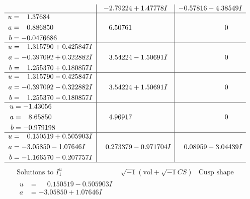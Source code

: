 \documentclass[1p]{elsarticle_modified}
\theoremstyle{definition}
\newcommand{\I}{\sqrt{-1}}
\begin{document}
$$\begin{array}{c|c|c}
 & -2.79224 + 1.47778 I & -0.57816 - 4.38549 I \\ \hline\begin{aligned}
u &= \phantom{-}1.37684\phantom{ +0.000000I} \\
a &= \phantom{-}0.886850\phantom{ +0.000000I} \\
b &= -0.0476686\phantom{ +0.000000I}\end{aligned}
 & \phantom{-}6.50761\phantom{ +0.000000I} & \phantom{-0.000000 } 0 \\ \hline\begin{aligned}
u &= \phantom{-}1.315790 + 0.425847 I \\
a &= -0.397092 + 0.322882 I \\
b &= \phantom{-}1.255370 + 0.180857 I\end{aligned}
 & \phantom{-}3.54224 - 1.50691 I & \phantom{-0.000000 } 0 \\ \hline\begin{aligned}
u &= \phantom{-}1.315790 - 0.425847 I \\
a &= -0.397092 - 0.322882 I \\
b &= \phantom{-}1.255370 - 0.180857 I\end{aligned}
 & \phantom{-}3.54224 + 1.50691 I & \phantom{-0.000000 } 0 \\ \hline\begin{aligned}
u &= -1.43056\phantom{ +0.000000I} \\
a &= \phantom{-}8.65850\phantom{ +0.000000I} \\
b &= -0.979198\phantom{ +0.000000I}\end{aligned}
 & \phantom{-}4.96917\phantom{ +0.000000I} & \phantom{-0.000000 } 0 \\ \hline\begin{aligned}
u &= \phantom{-}0.150519 + 0.505903 I \\
a &= -3.05850 - 1.07646 I \\
b &= -1.166570 - 0.207757 I\end{aligned}
 & \phantom{-}0.273379 - 0.971704 I & \phantom{-}0.08959 - 3.04439 I\\
 \hline 
 \end{array}$$\newpage$$\begin{array}{c|c|c}  
\text{Solutions to }I^u_{1}& \I (\text{vol} + \sqrt{-1}CS) & \text{Cusp shape}\\
 \hline 
\begin{aligned}
u &= \phantom{-}0.150519 - 0.505903 I \\
a &= -3.05850 + 1.07646 I \\

\end{aligned}
\end{array}$$
\end{document}
